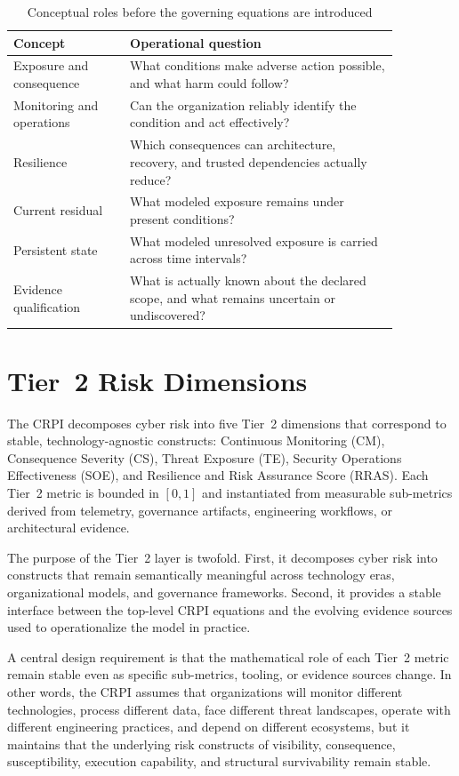 \documentclass[11pt]{article}
\begin{document}
\begin{table}[htbp]
\centering
\small
\caption{Conceptual roles before the governing equations are introduced}
\label{tab:conceptual-roles}
\begin{tabular}{p{0.26\linewidth} p{0.60\linewidth}}
\toprule
Concept & Operational question \\
\midrule
Exposure and consequence & What conditions make adverse action possible, and what harm could follow? \\
Monitoring and operations & Can the organization reliably identify the condition and act effectively? \\
Resilience & Which consequences can architecture, recovery, and trusted dependencies actually reduce? \\
Current residual & What modeled exposure remains under present conditions? \\
Persistent state & What modeled unresolved exposure is carried across time intervals? \\
Evidence qualification & What is actually known about the declared scope, and what remains uncertain or undiscovered? \\
\bottomrule
\end{tabular}
\end{table}

\section{Tier~2 Risk Dimensions}
\label{sec:tier2}
The CRPI decomposes cyber risk into five Tier~2 dimensions that correspond to stable,
technology-agnostic constructs: Continuous Monitoring (CM), Consequence Severity (CS),
Threat Exposure (TE), Security Operations Effectiveness (SOE), and Resilience and
Risk Assurance Score (RRAS). Each Tier~2 metric is bounded in $[0,1]$ and instantiated
from measurable sub-metrics derived from telemetry, governance artifacts, engineering
workflows, or architectural evidence.

The purpose of the Tier~2 layer is twofold. First, it decomposes cyber risk into
constructs that remain semantically meaningful across technology eras, organizational
models, and governance frameworks. Second, it provides a stable interface between the
top-level CRPI equations and the evolving evidence sources used to operationalize the
model in practice.

A central design requirement is that the mathematical role of each Tier~2 metric remain
stable even as specific sub-metrics, tooling, or evidence sources change. In other
words, the CRPI assumes that organizations will monitor different technologies, process
different data, face different threat landscapes, operate with different engineering
practices, and depend on different ecosystems, but it maintains that the underlying
risk constructs of visibility, consequence, susceptibility, execution capability, and
structural survivability remain stable.
\end{document}
